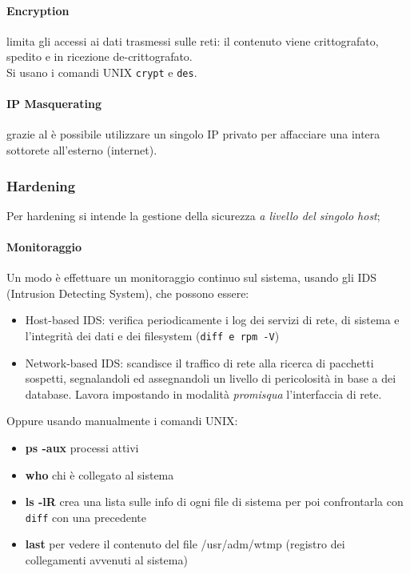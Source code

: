 \documentclass[a4paper,11pt]{article}
\def\code#1{\texttt{#1}}
\def\subsub#1{\subsubsection{#1}\label{#1}}
\def\vedi#1{\nameref{#1}}
\begin{document}
\paragraph{Encryption} limita gli accessi ai dati trasmessi sulle reti: il contenuto viene crittografato, spedito e in ricezione de-crittografato.\\
Si usano i comandi UNIX \code{crypt} e \code{des}.
\paragraph{IP Masquerating} grazie al \vedi{NAT} è possibile utilizzare un singolo IP privato per affacciare una intera sottorete all'esterno (internet).
\subsub{Hardening} 
Per hardening si intende la gestione della sicurezza \textit{a livello del singolo host};
\paragraph{Monitoraggio} Un modo è effettuare un monitoraggio continuo sul sistema, usando gli IDS (Intrusion Detecting System), che possono essere:
\begin{itemize}
\item Host-based IDS: verifica periodicamente i log dei servizi di rete, di sistema e l'integrità dei dati e dei filesystem (\code{diff e rpm -V})
\item Network-based IDS: scandisce il traffico di rete alla ricerca di pacchetti sospetti, segnalandoli ed assegnandoli un livello di pericolosità in base a dei database. Lavora impostando in modalità \textit{promisqua} l'interfaccia di rete.
\end{itemize}
Oppure usando manualmente i comandi UNIX:
\begin{itemize}
\item \textbf{ps -aux} processi attivi
\item \textbf{who} chi è collegato al sistema
\item \textbf{ls -lR} crea una lista sulle info di ogni file di sistema per poi confrontarla con \code{diff} con una precedente
\item \textbf{last} per vedere il contenuto del file /usr/adm/wtmp (registro dei collegamenti avvenuti al sistema)
\end{itemize}
\end{document}
